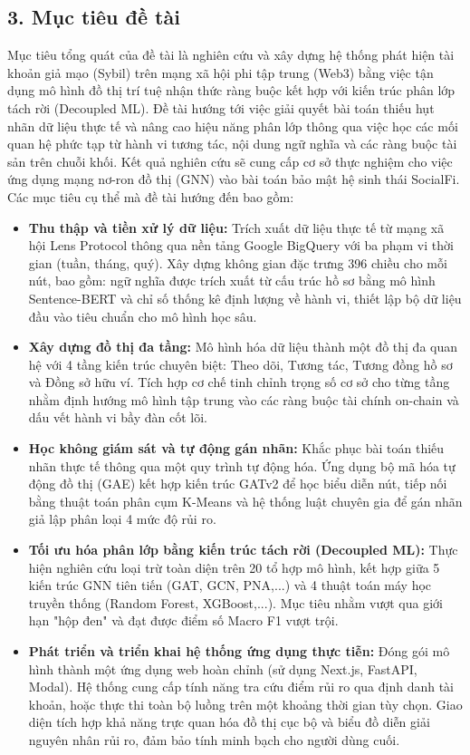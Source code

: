 \subsection{3. Mục tiêu đề tài}
\indent\indent Mục tiêu tổng quát của đề tài là nghiên cứu và xây dựng hệ thống phát hiện tài khoản giả mạo (Sybil) trên mạng xã hội phi tập trung (Web3) bằng việc tận dụng mô hình đồ thị trí tuệ nhận thức ràng buộc kết hợp với kiến trúc phân lớp tách rời (Decoupled ML). Đề tài hướng tới việc giải quyết bài toán thiếu hụt nhãn dữ liệu thực tế và nâng cao hiệu năng phân lớp thông qua việc học các mối quan hệ phức tạp từ hành vi tương tác, nội dung ngữ nghĩa và các ràng buộc tài sản trên chuỗi khối. Kết quả nghiên cứu sẽ cung cấp cơ sở thực nghiệm cho việc ứng dụng mạng nơ-ron đồ thị (GNN) vào bài toán bảo mật hệ sinh thái SocialFi. Các mục tiêu cụ thể mà đề tài hướng đến bao gồm:

\begin{itemize}[label={--}, itemsep=1pt]
    \item \textbf{Thu thập và tiền xử lý dữ liệu:} Trích xuất dữ liệu thực tế từ mạng xã hội Lens Protocol thông qua nền tảng Google BigQuery với ba phạm vi thời gian (tuần, tháng, quý). Xây dựng không gian đặc trưng 396 chiều cho mỗi nút, bao gồm: ngữ nghĩa được trích xuất từ cấu trúc hồ sơ bằng mô hình Sentence-BERT và chỉ số thống kê định lượng về hành vi, thiết lập bộ dữ liệu đầu vào tiêu chuẩn cho mô hình học sâu.
    
    \item \textbf{Xây dựng đồ thị đa tầng:} Mô hình hóa dữ liệu thành một đồ thị đa quan hệ với 4 tầng kiến trúc chuyên biệt: Theo dõi, Tương tác, Tương đồng hồ sơ và Đồng sở hữu ví. Tích hợp cơ chế tinh chỉnh trọng số cơ sở cho từng tầng nhằm định hướng mô hình tập trung vào các ràng buộc tài chính on-chain và dấu vết hành vi bầy đàn cốt lõi.
    
    \item \textbf{Học không giám sát và tự động gán nhãn:} Khắc phục bài toán thiếu nhãn thực tế thông qua một quy trình tự động hóa. Ứng dụng bộ mã hóa tự động đồ thị (GAE) kết hợp kiến trúc GATv2 để học biểu diễn nút, tiếp nối bằng thuật toán phân cụm K-Means và hệ thống luật chuyên gia để gán nhãn giả lập phân loại 4 mức độ rủi ro.
    
    \item \textbf{Tối ưu hóa phân lớp bằng kiến trúc tách rời (Decoupled ML):} Thực hiện nghiên cứu loại trừ toàn diện trên 20 tổ hợp mô hình, kết hợp giữa 5 kiến trúc GNN tiên tiến (GAT, GCN, PNA,...) và 4 thuật toán máy học truyền thống (Random Forest, XGBoost,...). Mục tiêu nhằm vượt qua giới hạn "hộp đen" và đạt được điểm số Macro F1 vượt trội.
    
    \item \textbf{Phát triển và triển khai hệ thống ứng dụng thực tiễn:} Đóng gói mô hình thành một ứng dụng web hoàn chỉnh (sử dụng Next.js, FastAPI, Modal). Hệ thống cung cấp tính năng tra cứu điểm rủi ro qua định danh tài khoản, hoặc thực thi toàn bộ luồng trên một khoảng thời gian tùy chọn. Giao diện tích hợp khả năng trực quan hóa đồ thị cục bộ và biểu đồ diễn giải nguyên nhân rủi ro, đảm bảo tính minh bạch cho người dùng cuối.
\end{itemize}